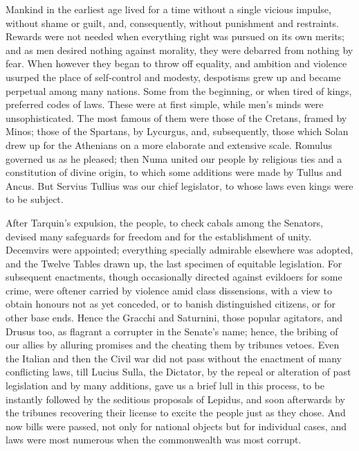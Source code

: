 
Mankind in the earliest age lived for a time without a single vicious impulse, without shame or guilt, and, consequently, without punishment and restraints. Rewards were not needed when everything right was pursued on its own merits; and as men desired nothing against morality, they were debarred from nothing by fear. When however they began to throw off equality, and ambition and violence usurped the place of self-control and modesty, despotisms grew up and became perpetual among many nations. Some from the beginning, or when tired of kings, preferred codes of laws. These were at first simple, while men's minds were unsophisticated. The most famous of them were those of the Cretans, framed by Minos; those of the Spartans, by Lycurgus, and, subsequently, those which Solan drew up for the Athenians on a more elaborate and extensive scale. Romulus governed us as he pleased; then Numa united our people by religious ties and a constitution of divine origin, to which some additions were made by Tullus and Ancus. But Servius Tullius was our chief legislator, to whose laws even kings were to be subject.


After Tarquin's expulsion, the people, to check cabals among the Senators, devised many safeguards for freedom and for the establishment of unity. Decemvirs were appointed; everything specially admirable elsewhere was adopted, and the Twelve Tables drawn up, the last specimen of equitable legislation. For subsequent enactments, though occasionally directed against evildoers for some crime, were oftener carried by violence amid class dissensions, with a view to obtain honours not as yet conceded, or to banish distinguished citizens, or for other base ends. Hence the Gracchi and Saturnini, those popular agitators, and Drusus too, as flagrant a corrupter in the Senate's name; hence, the bribing of our allies by alluring promises and the cheating them by tribunes vetoes. Even the Italian and then the Civil war did not pass without the enactment of many conflicting laws, till Lucius Sulla, the Dictator, by the repeal or alteration of past legislation and by many additions, gave us a brief lull in this process, to be instantly followed by the seditious proposals of Lepidus, and soon afterwards by the tribunes recovering their license to excite the people just as they chose. And now bills were passed, not only for national objects but for individual cases, and laws were most numerous when the commonwealth was most corrupt.

